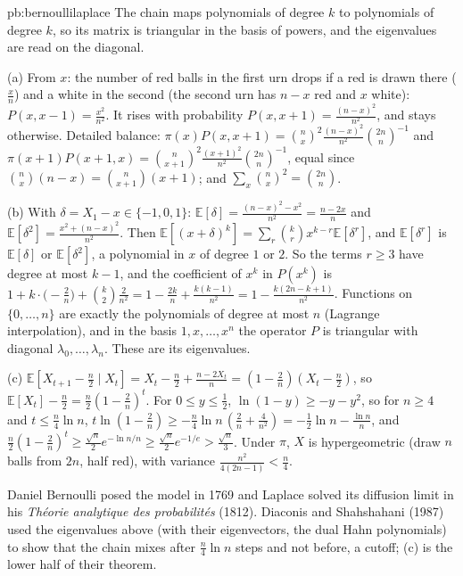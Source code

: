 \begin{solution}{pb:bernoullilaplace}
\idea The chain maps polynomials of degree $k$ to polynomials of degree $k$, so its matrix is triangular in the basis of powers, and the
eigenvalues are read on the diagonal.

\writeup (a) From $x$: the number of red balls in the first urn drops if a red is drawn there ($\frac xn$) and a white in the second (the second urn
has $n-x$ red and $x$ white): $P(x,x-1)=\frac{x^2}{n^2}$. It rises with probability $P(x,x+1)=\frac{(n-x)^2}{n^2}$, and stays otherwise. Detailed balance:
$\pi(x)P(x,x+1)=\binom nx^2\frac{(n-x)^2}{n^2}\binom{2n}n^{-1}$ and $\pi(x+1)P(x+1,x)=\binom n{x+1}^2\frac{(x+1)^2}{n^2}\binom{2n}n^{-1}$, equal since $\binom nx(n-x)=\binom n{x+1}(x+1)$; and $\sum_x\binom nx^2=\binom{2n}n$.

(b) With $\delta=X_1-x\in\{-1,0,1\}$: $\mathbb E[\delta]=\frac{(n-x)^2-x^2}{n^2}=\frac{n-2x}n$ and $\mathbb E[\delta^2]=\frac{x^2+(n-x)^2}{n^2}$. Then $\mathbb E[(x+\delta)^k]=\sum_r\binom krx^{k-r}\mathbb E[\delta^r]$, and $\mathbb E[\delta^r]$ is
$\mathbb E[\delta]$ or $\mathbb E[\delta^2]$, a polynomial in $x$ of degree $1$ or $2$. So the terms $r\ge3$ have degree at most $k-1$, and the coefficient of $x^k$ in $P(x^k)$ is
$1+k\cdot\bigl(-\frac2n\bigr)+\binom k2\frac2{n^2}=1-\frac{2k}n+\frac{k(k-1)}{n^2}=1-\frac{k(2n-k+1)}{n^2}$. Functions on $\{0,\dots,n\}$ are exactly the polynomials of degree at most $n$ (Lagrange interpolation),
and in the basis $1,x,\dots,x^n$ the operator $P$ is triangular with diagonal $\lambda_0,\dots,\lambda_n$. These are its eigenvalues.

(c) $\mathbb E[X_{t+1}-\frac n2\mid X_t]=X_t-\frac n2+\frac{n-2X_t}n=(1-\frac2n)(X_t-\frac n2)$, so $\mathbb E[X_t]-\frac n2=\frac n2(1-\frac2n)^t$. For $0\le y\le\frac12$, $\ln(1-y)\ge-y-y^2$, so for $n\ge4$ and $t\le\frac n4\ln n$,
$t\ln(1-\frac2n)\ge-\frac n4\ln n\,(\frac2n+\frac4{n^2})=-\frac12\ln n-\frac{\ln n}n$, and $\frac n2(1-\frac2n)^t\ge\frac{\sqrt n}2e^{-\ln n/n}\ge\frac{\sqrt n}2e^{-1/e}>\frac{\sqrt n}3$. Under $\pi$, $X$ is hypergeometric (draw $n$
balls from $2n$, half red), with variance $\frac{n^2}{4(2n-1)}<\frac n4$.

\leads Daniel Bernoulli posed the model in 1769 and Laplace solved its diffusion limit in his \emph{Théorie analytique des probabilités} (1812). Diaconis
and Shahshahani (1987) used the eigenvalues above (with their eigenvectors, the dual Hahn polynomials) to show that the chain mixes after
$\frac n4\ln n$ steps and not before, a cutoff; (c) is the lower half of their theorem.
\end{solution}

